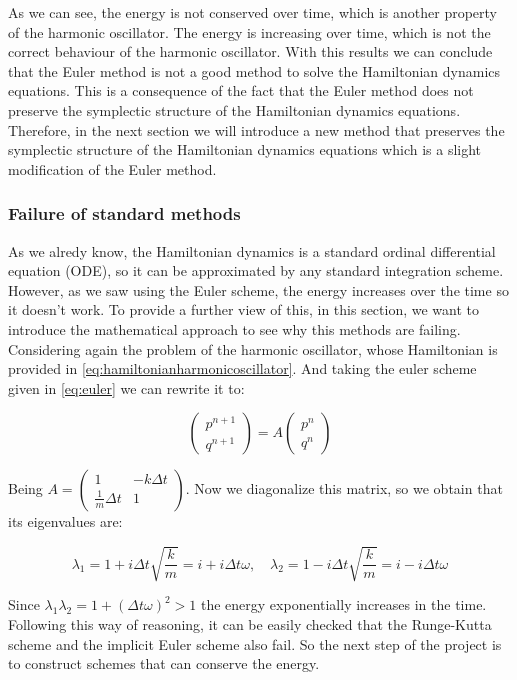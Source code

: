 \documentclass{article}
\begin{document}
As we can see, the energy is not conserved over time, which is another property of the harmonic oscillator. The energy is increasing over time, which is not the correct behaviour of the harmonic oscillator. With this results we can conclude that the Euler method is not a good method to solve the Hamiltonian dynamics equations. This is a consequence of the fact that the Euler method does not preserve the symplectic structure of the Hamiltonian dynamics equations. Therefore, in the next section we will introduce a new method that preserves the symplectic structure of the Hamiltonian dynamics equations which is a slight modification of the Euler method.

\subsubsection{Failure of standard methods}
\label{sec:failure_standard_methods}

As we alredy know, the Hamiltonian dynamics is a standard ordinal differential equation (ODE), so it can be approximated by any standard integration scheme. However, as we saw using the Euler scheme, the energy increases over the time so it doesn't work. To provide a further view of this, in this section, we want to introduce the mathematical approach to see why this methods are failing. Considering again the problem of the harmonic oscillator, whose Hamiltonian is provided in \ref{eq:hamiltonianharmonicoscillator}. And taking the euler scheme given in \ref{eq:euler} we can rewrite it to:

\[
	\begin{pmatrix} p^{n+1} \\ q^{n+1} \end{pmatrix} = A \begin{pmatrix} p^{n} \\ q^{n} \end{pmatrix}
\]

Being \(A = \begin{pmatrix} 1 & -k\Delta t \\ \frac{1}{m} \Delta t & 1  \end{pmatrix}\). Now we diagonalize this matrix, so we obtain that its eigenvalues are:

\[
	\lambda_1 = 1 + i\Delta t\sqrt{\frac{k}{m}} = i + i \Delta t \omega, \quad
	\lambda_2 = 1 - i\Delta t\sqrt{\frac{k}{m}} = i - i \Delta t \omega
\]

Since \(\lambda_1 \lambda_2 = 1 + (\Delta t \omega)^2 > 1\) the energy exponentially increases in the time. Following this way of reasoning, it can be easily checked that the Runge-Kutta scheme and the implicit Euler scheme also fail. So the next step of the project is to construct schemes that can conserve the energy.
\end{document}

